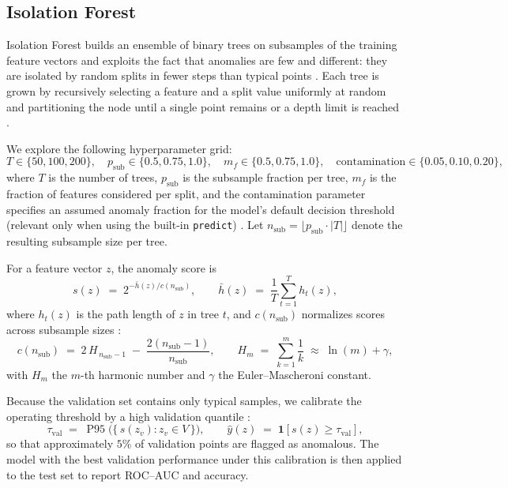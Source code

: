 \documentclass[pdflatex,sn-mathphys-ay]{sn-jnl}
\begin{document}
\subsection{Isolation Forest}

Isolation Forest builds an ensemble of binary trees on subsamples of the training feature vectors and exploits the fact that anomalies are few and different: they are isolated by random splits in fewer steps than typical points \citep{Liu2008,Liu2012}. Each tree is grown by recursively selecting a feature and a split value uniformly at random and partitioning the node until a single point remains or a depth limit is reached \citep{Liu2008}.

\noindent We explore the following hyperparameter grid:
\[
T \in \{50,100,200\},\quad
p_{\text{sub}} \in \{0.5,0.75,1.0\},\quad
m_f \in \{0.5,0.75,1.0\},\quad
\text{contamination} \in \{0.05,0.10,0.20\},
\]
where \(T\) is the number of trees, \(p_{\text{sub}}\) is the subsample fraction per tree, \(m_f\) is the fraction of features considered per split, and the contamination parameter specifies an assumed anomaly fraction for the model’s default decision threshold (relevant only when using the built-in \texttt{predict}) \citep{Liu2012}. Let \(n_{\text{sub}}=\lfloor p_{\text{sub}}\cdot |T| \rfloor\) denote the resulting subsample size per tree.

\noindent For a feature vector \(z\), the anomaly score is
\[
s(z) \;=\; 2^{-\bar{h}(z)/c(n_{\text{sub}})}, 
\qquad
\bar{h}(z) \;=\; \frac{1}{T}\sum_{t=1}^{T} h_t(z),
\]
where \(h_t(z)\) is the path length of \(z\) in tree \(t\), and \(c(n_{\text{sub}})\) normalizes scores across subsample sizes \citep{Liu2008}:
\[
c(n_{\text{sub}}) \;=\; 2\,H_{\,n_{\text{sub}}-1} \;-\; \frac{2(n_{\text{sub}}-1)}{n_{\text{sub}}},
\qquad
H_m \;=\; \sum_{k=1}^{m}\frac{1}{k} \;\approx\; \ln(m)+\gamma,
\]
with \(H_m\) the \(m\)-th harmonic number and \(\gamma\) the Euler–Mascheroni constant.

\noindent Because the validation set contains only typical samples, we calibrate the operating threshold by a high validation quantile \citep{Chandola2009,Campos2016,Ruff2021}:
\[
\tau_{\text{val}} \;=\; \operatorname{P95}\!\big(\{\, s(z_v) : z_v \in V \,\}\big),
\qquad
\hat{y}(z) \;=\; \mathbf{1}\!\left[s(z)\ge \tau_{\text{val}}\right],
\]
so that approximately \(5\%\) of validation points are flagged as anomalous. The model with the best validation performance under this calibration is then applied to the test set to report ROC–AUC and accuracy.
\end{document}
